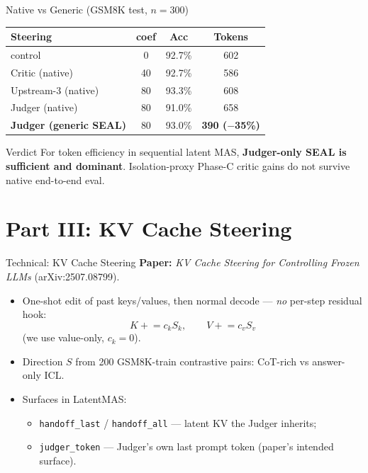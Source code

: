 \documentclass{beamer}
\begin{document}
\begin{frame}{Native vs Generic (GSM8K test, $n{=}300$)}
    \begin{table}
        \centering\footnotesize
        \begin{tabular}{lccc}
            \toprule
            Steering & coef & Acc & Tokens \\
            \midrule
            control & 0 & 92.7\% & 602 \\
            Critic (native) & 40 & 92.7\% & 586 \\
            Upstream-3 (native) & 80 & 93.3\% & 608 \\
            Judger (native) & 80 & 91.0\% & 658 \\
            \textbf{Judger (generic SEAL)} & 80 & 93.0\% & \textbf{390 ($-$35\%)} \\
            \bottomrule
        \end{tabular}
    \end{table}
    \vspace{0.2cm}
    \begin{block}{Verdict}
        For token efficiency in sequential latent MAS, \textbf{Judger-only SEAL is sufficient and dominant}. Isolation-proxy Phase-C critic gains do not survive native end-to-end eval.
    \end{block}
\end{frame}

\section{Part III: KV Cache Steering}
\begin{frame}{Technical: KV Cache Steering}
    \textbf{Paper:} \emph{KV Cache Steering for Controlling Frozen LLMs} (arXiv:2507.08799).
    \begin{itemize}
        \item One-shot edit of past keys/values, then normal decode --- \emph{no} per-step residual hook:
        \[
          K \mathrel{+}= c_k S_k,\qquad V \mathrel{+}= c_v S_v
        \]
        (we use value-only, $c_k{=}0$).
        \item Direction $S$ from 200 GSM8K-train contrastive pairs: CoT-rich vs answer-only ICL.
        \item Surfaces in LatentMAS:
        \begin{itemize}
            \item \texttt{handoff\_last} / \texttt{handoff\_all} --- latent KV the Judger inherits;
            \item \texttt{judger\_token} --- Judger's own last prompt token (paper's intended surface).
        \end{itemize}
    \end{itemize}
\end{frame}
\end{document}
